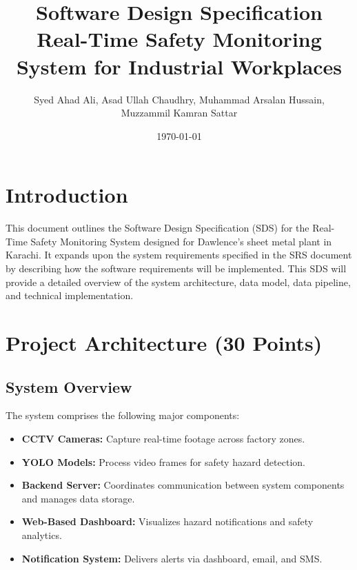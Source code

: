 \documentclass[12pt]{article}
\title{Software Design Specification \\ \large Real-Time Safety Monitoring System for Industrial Workplaces}
\author{Syed Ahad Ali, Asad Ullah Chaudhry, Muhammad Arsalan Hussain, \\ Muzzammil Kamran Sattar}
\date{\today}
\begin{document}
\maketitle
\tableofcontents
\newpage

\section{Introduction}
This document outlines the Software Design Specification (SDS) for the Real-Time Safety Monitoring System designed for Dawlence’s sheet metal plant in Karachi. It expands upon the system requirements specified in the SRS document by describing how the software requirements will be implemented. This SDS will provide a detailed overview of the system architecture, data model, data pipeline, and technical implementation.

\section{Project Architecture (30 Points)}
\subsection{System Overview}
The system comprises the following major components:
\begin{itemize}
    \item \textbf{CCTV Cameras:} Capture real-time footage across factory zones.
    \item \textbf{YOLO Models:} Process video frames for safety hazard detection.
    \item \textbf{Backend Server:} Coordinates communication between system components and manages data storage.
    \item \textbf{Web-Based Dashboard:} Visualizes hazard notifications and safety analytics.
    \item \textbf{Notification System:} Delivers alerts via dashboard, email, and SMS.
\end{itemize}
\end{document}
